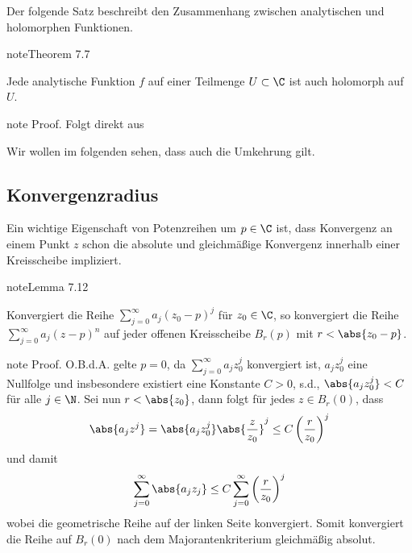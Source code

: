 \documentclass[letterpaper,10pt,german]{jupyterBook}
\begin{document}
\sphinxAtStartPar
Der folgende Satz beschreibt den Zusammenhang zwischen analytischen und holomorphen Funktionen.
\label{complexanalysis/powerseries:thm:analytischHolomorph}
\begin{sphinxadmonition}{note}{Theorem 7.7}



\sphinxAtStartPar
Jede analytische Funktion \(f\) auf einer Teilmenge \(U \subset \C\) ist auch holomorph auf \(U\).
\end{sphinxadmonition}

\begin{sphinxadmonition}{note}
\sphinxAtStartPar
Proof. Folgt direkt aus {\hyperref[\detokenize{complexanalysis/powerseries:lem:potseries}]{}}
\end{sphinxadmonition}

\sphinxAtStartPar
Wir wollen im folgenden sehen, dass auch die Umkehrung gilt.


\subsection{Konvergenzradius}
\label{\detokenize{complexanalysis/powerseries:konvergenzradius}}
\sphinxAtStartPar
Ein wichtige Eigenschaft von Potenzreihen um \(p\in\C\) ist, dass Konvergenz an einem Punkt \(z\) schon die absolute und gleichmäßige Konvergenz innerhalb einer Kreisscheibe impliziert.
\label{complexanalysis/powerseries:lem:powerradius}
\begin{sphinxadmonition}{note}{Lemma 7.12}



\sphinxAtStartPar
Konvergiert die Reihe \(\sum_{j=0}^\infty a_j (z_0-p)^j\) für \(z_0\in\C\), so konvergiert die Reihe \(\sum_{j=0}^\infty a_j (z-p)^n\) auf jeder offenen Kreisscheibe \(B_r(p)\) mit \(r< \abs{z_0 - p}\).
\end{sphinxadmonition}

\begin{sphinxadmonition}{note}
\sphinxAtStartPar
Proof. O.B.d.A. gelte \(p=0\), da \(\sum_{j=0}^\infty a_j z_0^j\) konvergiert ist, \(a_j z_0^j\) eine Nullfolge und insbesondere existiert eine Konstante \(C>0\), s.d., \(\abs{a_j z_0^j}< C\) für alle \(j\in\N\). Sei nun \(r<\abs{z_0}\), dann folgt für jedes \(z\in B_r(0)\), dass
\begin{equation*}
\begin{split}\abs{a_j z^j} = \abs{a_j z_0^j}\abs{\frac{z}{z_0}}^j\leq C \left(\frac{r}{z_0}\right)^j\end{split}
\end{equation*}
\sphinxAtStartPar
und damit
\begin{equation*}
\begin{split}\sum_{j=0}^\infty \abs{a_j z_j} \leq C \sum_{j=0}^\infty \left(\frac{r}{z_0}\right)^j\end{split}
\end{equation*}
\sphinxAtStartPar
wobei die geometrische Reihe auf der linken Seite konvergiert. Somit konvergiert die Reihe auf \(B_r(0)\) nach dem Majorantenkriterium gleichmäßig absolut.
\end{sphinxadmonition}
\end{document}
